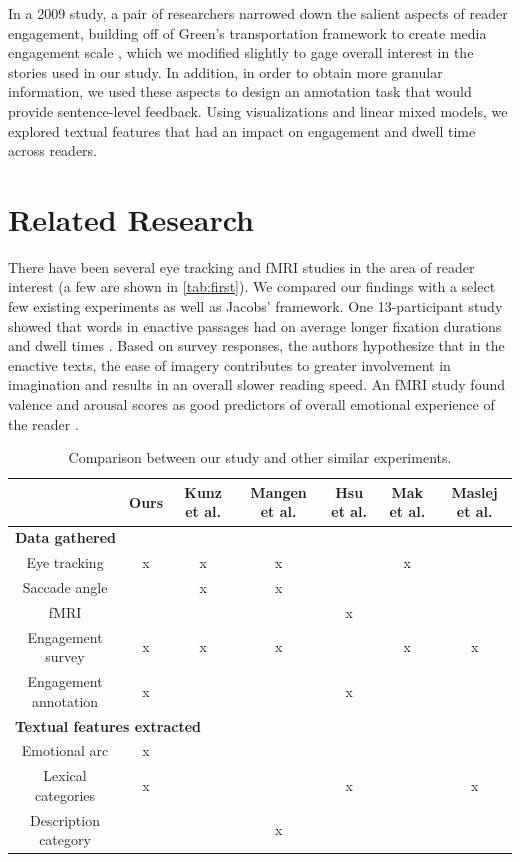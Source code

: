 \documentclass[11pt]{article}
\begin{document}
In a 2009 study, a pair of researchers narrowed down the salient aspects of reader engagement, building off of Green's transportation framework to create media engagement scale \citep{busselle2009}, which we modified slightly to gage overall interest in the stories used in our study. In addition, in order to obtain more granular information, we used these aspects to design an annotation task that would provide sentence-level feedback. Using visualizations and linear mixed models, we explored textual features that had an impact on engagement and dwell time across readers.

\section{Related Research}
There have been several eye tracking and fMRI studies in the area of reader interest (a few are shown in \autoref{tab:first}). We compared our findings with a select few existing experiments as well as Jacobs' framework. One 13-participant study showed that words in enactive passages had on average longer fixation durations and dwell times \citep{Magyari2020}. Based on survey responses, the authors hypothesize that in the enactive texts, the ease of imagery contributes to greater involvement in imagination and results in an overall slower reading speed. An fMRI study found valence and arousal scores as good predictors of overall emotional experience of the reader \citep{HSU201596}. 


\begin{table}[h]
\centering
\begin{tabular}{|c|c|c|c|c|c|c|}
\hline
& \textbf{Ours} & \textbf{Kunz et al.} & \textbf{Mangen et al.} & \textbf{Hsu et al.} & \textbf{Mak et al.} & \textbf{Maslej et al.} \\
\hline
\multicolumn{7}{|l|}{\textbf{Data gathered}}\\\hline
Eye tracking & x & x & x &  & x &  \\\hline
Saccade angle &  & x & x &  &  & \\\hline
fMRI &  &  &  & x &  & \\\hline
Engagement survey & x & x & x &  & x & x\\\hline
Engagement annotation & x &  &  & x &  & \\\hline
\multicolumn{7}{|l|}{\textbf{Textual features extracted}}\\\hline
Emotional arc & x &  &  &  &  & \\\hline
Lexical categories & x &  &  & x &  & x\\\hline
Description category &  &  & x &  &  & \\\hline

\end{tabular}
\caption{Comparison between our study and other similar experiments.}
\label{tab:first}
\end{table}
\end{document}
